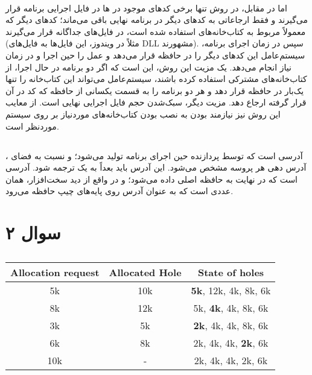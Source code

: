 \documentclass{article}
\begin{document}
	\paragraph*{}
	اما در مقابل، در روش
	تنها برخی کدهای موجود در
	ها
	در فایل اجرایی برنامه قرار می‌گیرند و فقط ارجاعاتی به کدهای دیگر در برنامه نهایی باقی می‌ماند؛ کد‌های دیگر که معمولاً مربوط به کتاب‌خانه‌های استفاده شده است، در فایل‌های جداگانه قرار می‌گیرند (مثلاً در ویندوز، این فایل‌ها به فایل‌های DLL مشهورند). سپس در زمان اجرای برنامه، سیستم‌عامل این کدهای دیگر را در حافظه قرار می‌دهد و عمل
	را حین اجرا و در زمان نیاز انجام می‌دهد. یک مزیت این روش، این است که اگر دو برنامه در حال اجرا، از کتاب‌خانه‌های مشترکی استفاده کرده باشند، سیستم‌عامل می‌تواند این کتاب‌خانه را تنها یک‌بار در حافظه قرار دهد و هر دو برنامه را به قسمت یکسانی از حافظه که کد در آن قرار گرفته ارجاع دهد. مزیت دیگر، سبک‌شدن حجم فایل اجرایی نهایی است. از معایب این روش نیز نیازمند بودن به نصب بودن کتاب‌خانه‌های موردنیاز بر روی سیستم موردنظر است.

	\subsection*{}
	\paragraph*{}
	،
	آدرسی است که توسط پردازنده حین اجرای برنامه تولید می‌شود؛ و نسبت به فضای آدرس دهی هر پروسه مشخص می‌شود. این آدرس باید بعداً به یک
	ترجمه شود.
	آدرسی است که در نهایت به حافظه اصلی داده می‌شود؛ و در واقع از دید سخت‌افزار، همان عددی است که به عنوان آدرس روی پایه‌های چیپ حافظه می‌رود.

	\section*{سوال ۲}
	\subsection*{}
	\paragraph*{}

	\begin{latin}
		\centering
		\begin{tabular}{c|c|c}
			Allocation request & Allocated Hole & State of holes \\
			\hline
			5k & 10k & \textbf{5k}, 12k, 4k, 8k, 6k\\
			\hline
			8k & 12k & 5k, \textbf{4k}, 4k, 8k, 6k \\
			\hline
			3k & 5k &  \textbf{2k}, 4k, 4k, 8k, 6k\\
			\hline
			6k & 8k & 2k, 4k, 4k, \textbf{2k}, 6k\\
			\hline
			10k & - & 2k, 4k, 4k, 2k, 6k\\
		\end{tabular}
	\end{latin}
\end{document}
